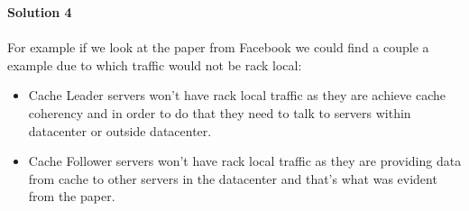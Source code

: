 \documentclass[letterpaper, 11pt]{article}
\begin{document}
\bigskip

\textbf{Solution 4}\\ \\
For example if we look at the paper from Facebook we could find a couple a example due to which traffic would not be rack local:
\begin{itemize}
\item Cache Leader servers won't have rack local traffic as they are achieve cache coherency and in order to do that they need to talk to servers within datacenter or outside datacenter.
\item Cache Follower servers won't have rack local traffic as they are providing data from cache to other servers in the datacenter and that's what was evident from the paper.
\end{itemize}
\bigskip
\end{document}
